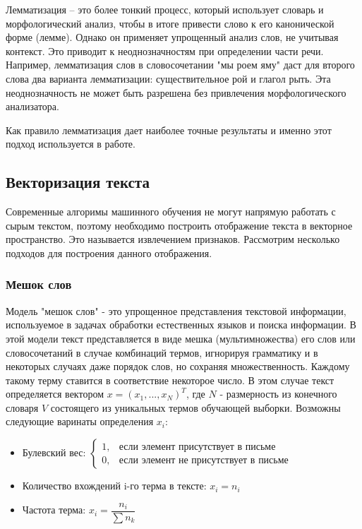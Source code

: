 \documentclass[12pt]{article}
\begin{document}
Лемматизация -- это более тонкий процесс, который использует словарь и морфологический анализ, чтобы в итоге привести слово к его канонической форме (лемме). Однако он применяет упрощенный анализ слов, не учитывая контекст. Это приводит к неоднозначностям при определении части речи. Например, лемматизация слов в словосочетании "мы роем яму" даст для второго слова два варианта лемматизации: существительное рой и глагол рыть. Эта неоднозначность не может быть разрешена без привлечения морфологического анализатора.

Как правило лемматизация дает наиболее точные результаты и именно этот подход используется в работе.

\subsection*{Векторизация текста}
Современные алгоримы машинного обучения не могут напрямую работать с сырым текстом, поэтому необходимо построить отображение текста в векторное пространство. Это называется извлечением признаков. Рассмотрим несколько подходов для построения данного отображения.

\subsubsection*{Мешок слов}
Модель "мешок слов" - это упрощенное представления текстовой информации, используемое в задачах обработки естественных языков и поиска информации. В этой модели текст представляется в виде мешка (мультимножества) его слов или словосочетаний в случае комбинаций термов, игнорируя грамматику и в некоторых случаях даже порядок слов, но сохраняя множественность. Каждому такому терму ставится в соответствие некоторое число. В этом случае текст определяется вектором $x=(x_1, ..., x_N)^T$, где $N$ - размерность из конечного словаря $V$ состоящего из уникальных термов обучающей выборки. Возможны следующие варинаты определения $x_i$:

\begin{itemize}
\item Булевский вес: $\begin{cases} 1, & \mbox{если элемент присутствует в письме} \\ 0, & \mbox{если элемент не присутствует в письме}  \end{cases}$
\item Количество вхождений i-го терма в тексте: $x_i = n_i$
\item Частота терма: $x_i = \dfrac{n_i}{\sum n_k}$
\end{itemize}
\end{document}
